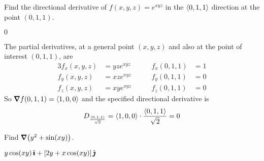 


\subsection*{\Conceptual}



\begin{question}[M200 2008A] %
Find the directional derivative of $f(x,y,z) = e^{xyz}$ in the $\left< 0,1,1\right>$ 
direction at the point $(0,1,1)$.
\end{question}

%

\begin{answer}
$0$
\end{answer}

\begin{solution}
The partial derivatives, at a general point $(x,y,z)$ and
also at the point of interest $(0,1,1)$, are
\begin{alignat*}{3}
f_x(x,y,z)&=yz e^{xyz}\qquad &
   f_x(0,1,1)&= 1 \\
f_y(x,y,z)&=xz e^{xyz}\qquad &
   f_y(0,1,1)&= 0 \\
f_z(x,y,z)&=xy e^{xyz}\qquad &
   f_z(0,1,1)&= 0 
\end{alignat*}
So $\vnabla f(0,1,1) =\llt 1,0,0\rgt$ and the specified directional derivative
is
\begin{align*}
D_{\frac{\left< 0,1,1\right>}{\sqrt{2}}}
=\left< 1,0,0\right>\cdot\frac{\left< 0,1,1\right>}{\sqrt{2}}
=0
\end{align*}
\end{solution}

\begin{question}[M200 2008A] %
Find $\vnabla\big(y^2 + \sin(xy)\big)$.
\end{question}

%

\begin{answer}
$y\cos(xy)\,\hat{\pmb{\imath}} +  [2y + x\cos(xy)]\,\hat{\pmb{\jmath}}$
\end{answer}

